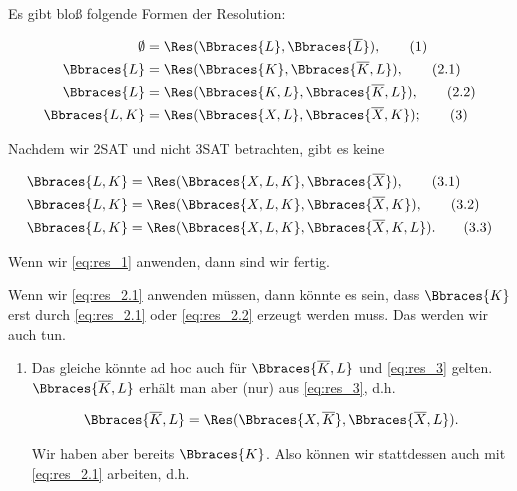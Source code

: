 \begin{solution}

Es gibt bloß folgende Formen der Resolution:

\begin{align}
    \emptyset & = \Res(\Bbraces{L}, \Bbraces{\overline L}), \label{eq:res_1} \tag{1} \\
    \Bbraces{L} & = \Res(\Bbraces{K}, \Bbraces{\overline K, L}), \label{eq:res_2.1} \tag{2.1} \\
    \Bbraces{L} & = \Res(\Bbraces{K, L}, \Bbraces{\overline K, L}), \label{eq:res_2.2} \tag{2.2} \\
    \Bbraces{L, K} & = \Res(\Bbraces{X, L}, \Bbraces{\overline X, K}); \label{eq:res_3} \tag{3}
\end{align}

Nachdem wir 2SAT und nicht 3SAT betrachten, gibt es keine

\begin{align}
    \Bbraces{L, K} & = \Res(\Bbraces{X, L, K}, \Bbraces{\overline X}), \label{eq:res_3.1} \tag{3.1} \\
    \Bbraces{L, K} & = \Res(\Bbraces{X, L, K}, \Bbraces{\overline X, K}), \label{eq:res_3.2} \tag{3.2} \\
    \Bbraces{L, K} & = \Res(\Bbraces{X, L, K}, \Bbraces{\overline X, K, L}). \label{eq:res_3.3} \tag{3.3} \\
\end{align}

Wenn wir \eqref{eq:res_1} anwenden, dann sind wir fertig.

Wenn wir \eqref{eq:res_2.1} anwenden müssen, dann könnte es sein, dass $\Bbraces{K}$ erst durch \eqref{eq:res_2.1} oder \eqref{eq:res_2.2} erzeugt werden muss.
Das werden wir auch tun.

\begin{enumerate}[label = \arabic*., start = 0]

    \item Das gleiche könnte ad hoc auch für $\Bbraces{\overline K, L}$ und \eqref{eq:res_3} gelten.
    $\Bbraces{\overline K, L}$ erhält man aber (nur) aus \eqref{eq:res_3}, d.h.

    \begin{align*}
        \Bbraces{\overline K, L}
        =
        \Res(\Bbraces{X, \overline K}, \Bbraces{\overline X, L}).
    \end{align*}

    Wir haben aber bereits $\Bbraces{K}$.
    Also können wir stattdessen auch mit \eqref{eq:res_2.1} arbeiten, d.h.


\end{enumerate}
\end{solution}
